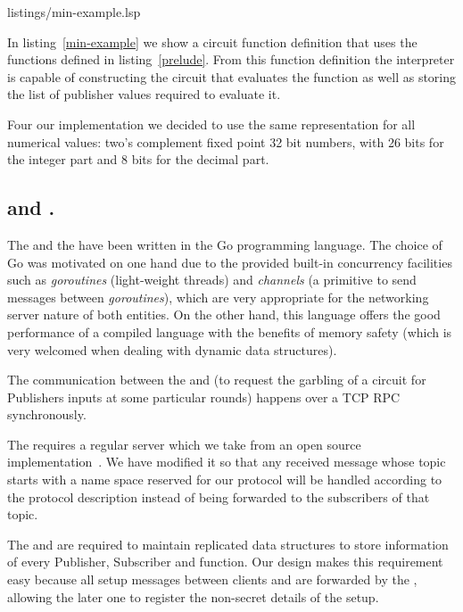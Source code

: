 \noindent
\begin{minipage}{\linewidth}

{listings/min-example.lsp}
\end{minipage}

In listing~\ref{min-example} we show a circuit function definition that uses
the functions defined in listing~\ref{prelude}.  From this function definition
the interpreter is capable of constructing the circuit that evaluates the
function as well as storing the list of publisher values required to evaluate
it.

Four our implementation we decided to use the same representation for all
numerical values: two's complement fixed point 32 bit numbers, with 26 bits for
the integer part and 8 bits for the decimal part.

\subsection{\broker and \garbler.}

The \broker and the \garbler have been written in the Go programming
language.  The choice of Go was motivated on one hand due to the provided
built-in concurrency facilities such as \emph{goroutines} (light-weight
threads) and \emph{channels} (a primitive to send messages between
\emph{goroutines}), which are very appropriate for the networking server nature
of both entities.  On the other hand, this language offers the good performance
of a compiled language with the benefits of memory safety (which is very
welcomed when dealing with dynamic data structures).

The communication between the \broker and \garbler (to request the garbling
of a circuit for Publishers inputs at some particular rounds) happens over a
TCP RPC synchronously.

The \broker requires a regular \MQTT{} \broker server which we take from an
open source implementation~\cite{mqttgo}.  We have modified it so that any
received message whose topic starts with a name space reserved for our
protocol will be handled according to the protocol description instead of
being forwarded to the subscribers of that topic.

The \broker and \garbler are required to maintain replicated data structures
to store information of every Publisher, Subscriber and function.  Our design
makes this requirement easy because all setup messages between clients and
\garbler are forwarded by the \broker, allowing the later one to register the
non-secret details of the setup.

